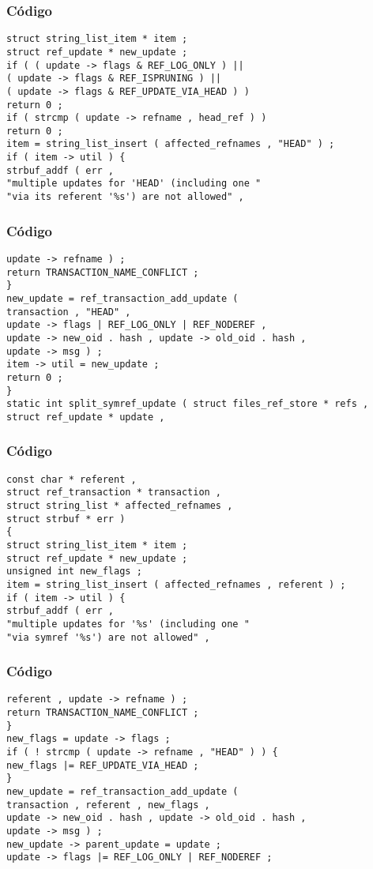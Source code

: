 \documentclass{beamer}
\begin{document}
\begin{frame}[fragile]
\frametitle{C\'odigo}
\begin{verbatim}
struct string_list_item * item ; 
struct ref_update * new_update ; 
if ( ( update -> flags & REF_LOG_ONLY ) || 
( update -> flags & REF_ISPRUNING ) || 
( update -> flags & REF_UPDATE_VIA_HEAD ) ) 
return 0 ; 
if ( strcmp ( update -> refname , head_ref ) ) 
return 0 ; 
item = string_list_insert ( affected_refnames , "HEAD" ) ; 
if ( item -> util ) { 
strbuf_addf ( err , 
"multiple updates for 'HEAD' (including one " 
"via its referent '%s') are not allowed" , 
\end{verbatim}
\end{frame}
\begin{frame}[fragile]
\frametitle{C\'odigo}
\begin{verbatim}
update -> refname ) ; 
return TRANSACTION_NAME_CONFLICT ; 
} 
new_update = ref_transaction_add_update ( 
transaction , "HEAD" , 
update -> flags | REF_LOG_ONLY | REF_NODEREF , 
update -> new_oid . hash , update -> old_oid . hash , 
update -> msg ) ; 
item -> util = new_update ; 
return 0 ; 
} 
static int split_symref_update ( struct files_ref_store * refs , 
struct ref_update * update , 
\end{verbatim}
\end{frame}
\begin{frame}[fragile]
\frametitle{C\'odigo}
\begin{verbatim}
const char * referent , 
struct ref_transaction * transaction , 
struct string_list * affected_refnames , 
struct strbuf * err ) 
{ 
struct string_list_item * item ; 
struct ref_update * new_update ; 
unsigned int new_flags ; 
item = string_list_insert ( affected_refnames , referent ) ; 
if ( item -> util ) { 
strbuf_addf ( err , 
"multiple updates for '%s' (including one " 
"via symref '%s') are not allowed" , 
\end{verbatim}
\end{frame}
\begin{frame}[fragile]
\frametitle{C\'odigo}
\begin{verbatim}
referent , update -> refname ) ; 
return TRANSACTION_NAME_CONFLICT ; 
} 
new_flags = update -> flags ; 
if ( ! strcmp ( update -> refname , "HEAD" ) ) { 
new_flags |= REF_UPDATE_VIA_HEAD ; 
} 
new_update = ref_transaction_add_update ( 
transaction , referent , new_flags , 
update -> new_oid . hash , update -> old_oid . hash , 
update -> msg ) ; 
new_update -> parent_update = update ; 
update -> flags |= REF_LOG_ONLY | REF_NODEREF ; 
\end{verbatim}
\end{frame}
\end{document}
